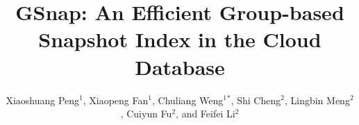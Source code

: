 \documentclass[sigconf, nonacm]{acmart}
\begin{document}
\title{GSnap: An Efficient Group-based Snapshot Index in the Cloud Database}


\author{Xiaoshuang Peng$^1$, Xiaopeng Fan$^1$, Chuliang Weng$^1$$^\ast$, Shi Cheng$^2$, Lingbin Meng$^2$, Cuiyun Fu$^2$, and Feifei Li$^2$}



%
%
\end{document}
